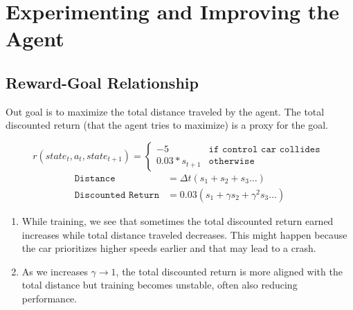 \section{Experimenting and Improving the Agent}
\subsection{Reward-Goal Relationship}\label{sec:reward-goal}
Out goal is to maximize the total distance traveled by the agent. The total discounted return (that the agent tries to maximize) is a proxy for the goal.

\begin{equation}\label{eqn:reward_vanilla}
r(state_t, a_t, state_{t+1}) = \begin{cases}
-5 & \texttt{if control car collides } \\
0.03*s_{t+1} & \texttt{otherwise}
 \end{cases} 
\end{equation}
\begin{align*}
\texttt{Distance} &= \Delta t (s_1 + s_2 + s_3 \dots)\\
\texttt{Discounted Return} &= 0.03 (s_1 + \gamma s_2 + \gamma^ 2 s_3 \dots)
\end{align*}

\begin{enumerate}
    \item While training, we see that sometimes the total discounted return earned increases while total distance traveled decreases. This might happen because the car prioritizes higher speeds earlier and that may lead to a crash. 

    \item As we increases $\gamma \to 1$, the total discounted return is more aligned with the total distance but training becomes unstable, often also reducing performance.
\end{enumerate}

